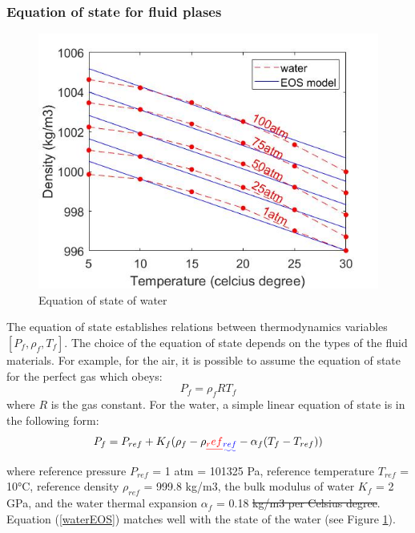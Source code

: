 \documentclass[preprint,12pt]{elsarticle}
\providecommand{\DIFadd}[1]{{\protect\color{blue}\uwave{#1}}} %
\providecommand{\DIFdel}[1]{{\protect\color{red}\sout{#1}}}                      %
\providecommand{\DIFaddbegin}{} %
\providecommand{\DIFaddend}{} %
\providecommand{\DIFdelbegin}{} %
\providecommand{\DIFdelend}{} %
\newcommand{\DIFscaledelfig}{0.5}
\newlength{\DIFdelgraphicswidth} %
\newlength{\DIFdelgraphicsheight} %
\newcommand{\DIFaddincludegraphics}[2][]{{\color{blue}\fbox{\DIFOincludegraphics[#1]{#2}}}} %
\newcommand{\DIFdelincludegraphics}[2][]{%
\sbox{\DIFdelgraphicsbox}{\DIFOincludegraphics[#1]{#2}}%
\settoboxwidth{\DIFdelgraphicswidth}{\DIFdelgraphicsbox} %
\settoboxtotalheight{\DIFdelgraphicsheight}{\DIFdelgraphicsbox} %
\scalebox{\DIFscaledelfig}{%
\parbox[b]{\DIFdelgraphicswidth}{\usebox{\DIFdelgraphicsbox}\\[-\baselineskip] \rule{\DIFdelgraphicswidth}{0em}}\llap{\resizebox{\DIFdelgraphicswidth}{\DIFdelgraphicsheight}{%
\setlength{\unitlength}{\DIFdelgraphicswidth}%
\begin{picture}(1,1)%
\thicklines\linethickness{2pt} %
{\color[rgb]{1,0,0}\put(0,0){\framebox(1,1){}}}%
{\color[rgb]{1,0,0}\put(0,0){\line( 1,1){1}}}%
{\color[rgb]{1,0,0}\put(0,1){\line(1,-1){1}}}%
\end{picture}%
}\hspace*{3pt}}} %
} %
\DeclareRobustCommand{\DIFaddbegin}{\DIFOaddbegin \let\includegraphics\DIFaddincludegraphics} %
\DeclareRobustCommand{\DIFaddend}{\DIFOaddend \let\includegraphics\DIFOincludegraphics} %
\DeclareRobustCommand{\DIFdelbegin}{\DIFOdelbegin \let\includegraphics\DIFdelincludegraphics} %
\DeclareRobustCommand{\DIFdelend}{\DIFOaddend \let\includegraphics\DIFOincludegraphics} %
\begin{document}
\subsubsection{Equation of state for fluid plases}
%
%
\begin{figure}[h]
\center
\includegraphics[scale=.5]{water1.jpg}
\caption{Equation of state of water}
\label{fig:water1}
\end{figure}
%
%
The equation of state establishes relations between thermodynamics variables $[P_f, \rho_f, T_f]$. The choice of the equation of state depends on the types of the fluid materials. For example, for the air, it is possible to assume the equation of state for the perfect gas which obeys:
%
%
\begin{equation}
    P_f = \rho_f R T_f
\end{equation}
%
%
where $R$ is the gas constant. For the water, a simple linear equation of state is in the following form:
%
%
\begin{equation}
    P_f = P_{ref} + K_f (\rho_f - \rho\DIFdelbegin \DIFdel{_ref }\DIFdelend \DIFaddbegin \DIFadd{_{ref} }\DIFaddend - \alpha_f(T_f - T_{ref}))
\label{waterEOS}
\end{equation}
%
%
where reference pressure $P_{ref}$ = 1 atm = 101325 Pa, reference temperature $T_{ref}$ = 10°C, reference density  $\rho_{ref}$ = 999.8 kg/m3, the bulk modulus of water $K_f$ = 2 GPa, and the water thermal expansion $\alpha_f$ = 0.18 \DIFdelbegin \DIFdel{kg/m3 per Celsius degree}\DIFdelend \DIFaddbegin \DIFadd{°$C^{-1}$}\DIFaddend . Equation (\ref{waterEOS}) matches well with the state of the water (see Figure \ref{fig:water1}).
\end{document}
